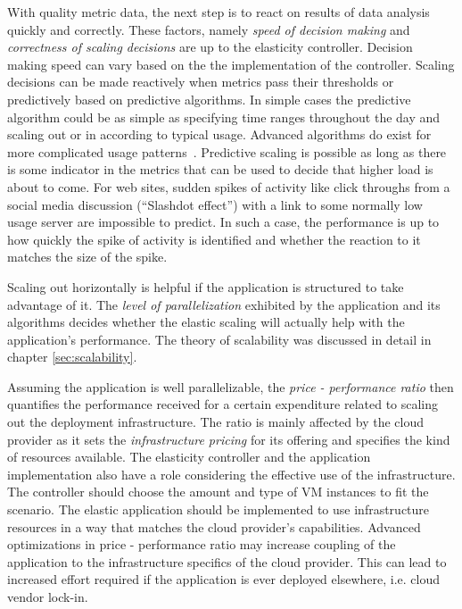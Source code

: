 \documentclass[english]{tktltiki2}
\theoremstyle{definition}
\theoremstyle{remark}
\begin{document}
With quality metric data, the next step is to react on results of data analysis
quickly and correctly. These factors, namely \textit{speed of decision making}
and \textit{correctness of scaling decisions} are up to the elasticity
controller. Decision making speed can vary based on the the implementation of
the controller. Scaling decisions can be made reactively when metrics pass their
thresholds or predictively based on predictive algorithms. In simple cases the
predictive algorithm could be as simple as specifying time ranges throughout the
day and scaling out or in according to typical usage. Advanced algorithms do
exist for more complicated usage patterns~\cite{Iqbal2011}\cite{Tan2012}\cite{
Roy2011}\cite{Chen2011}\cite{Wilkes2010}\cite{Cunha2011}.
Predictive scaling is possible as long as there is some indicator in the metrics
that can be used to decide that higher load is about to come. For web sites,
sudden spikes of activity like click throughs from a social media discussion
(``Slashdot effect'') with a link to some normally low usage server are
impossible to predict. In such a case, the performance is up to how quickly the
spike of activity is identified and whether the reaction to it matches the size
of the spike.

Scaling out horizontally is helpful if the application is structured to take
advantage of it. The \textit{level of parallelization} exhibited by the
application and its algorithms decides whether the elastic scaling will actually
help with the application's performance. The theory of scalability was discussed
in detail in chapter \ref{sec:scalability}.

Assuming the application is well parallelizable, the \textit{price - performance
ratio} then quantifies the performance received for a certain expenditure
related to scaling out the deployment infrastructure. The ratio is mainly
affected by the cloud provider as it sets the \textit{infrastructure pricing}
for its offering and specifies the kind of resources available. The elasticity
controller and the application implementation also have a role considering the
effective use of the infrastructure. The controller should choose the amount and
type of VM instances to fit the scenario. The elastic application should be
implemented to use infrastructure resources in a way that matches the cloud
provider's capabilities. Advanced optimizations in price - performance ratio may
increase coupling of the application to the infrastructure specifics of the
cloud provider. This can lead to increased effort required if the application is
ever deployed elsewhere, i.e. cloud vendor lock-in.
\end{document}
